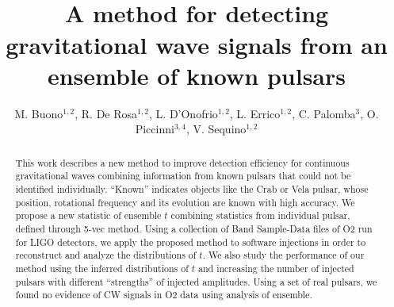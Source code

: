 \documentclass[11pt,a4paper,final]{iopart}
\begin{document}
\title[]{\vspace{-3.5cm}\\A method for detecting gravitational wave signals from an ensemble of known pulsars}

\author{M. Buono$^{1,2}$, R. De Rosa$^{1,2}$, L. D'Onofrio$^{1,2}$, L. Errico$^{1,2}$, C. Palomba$^{3}$, O. Piccinni$^{3,4}$, V. Sequino$^{1,2}$}
\address{$^1$Università di Napoli “Federico II”, I-80126 Napoli, Italy
\\$^2$INFN, Sezione di Napoli, I-80126 Napoli, Italy
\\$^3$INFN, Sezione di Roma, I-00185 Roma, Italy
\\$^4$Università di Roma “La Sapienza",I-00185 Roma, Italy}


\begin{abstract}
This work describes a new method to improve detection efficiency for continuous gravitational waves combining information from known pulsars that could not be identified individually. “Known” indicates objects like the Crab or Vela pulsar, whose position, rotational frequency and its evolution are known with high accuracy. 
We propose a new statistic of ensemble $t$ combining statistics from individual pulsar, defined through 5-vec method.
Using a collection of Band Sample-Data files of O2 run for LIGO detectors, we apply the proposed method to software injections in order to reconstruct and analyze the distributions of $t$. We also study the performance of our method using the inferred distributions of $t$ and increasing the number of injected pulsars with different “strengths” of injected amplitudes. Using a set of real pulsars, we found no evidence of CW signals in O2 data using analysis of ensemble.

\end{abstract}
\end{document}
